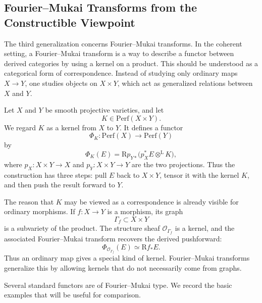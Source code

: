 \subsection{Fourier--Mukai Transforms from the Constructible Viewpoint}

The third generalization concerns Fourier--Mukai transforms. In the coherent
setting, a Fourier--Mukai transform is a way to describe a functor between
derived categories by using a kernel on a product. This should be understood
as a categorical form of correspondence. Instead of studying only ordinary maps
\(X\to Y\), one studies objects on \(X\times Y\), which act as generalized
relations between \(X\) and \(Y\).

Let \(X\) and \(Y\) be smooth projective varieties, and let
\[
K\in \mathrm{Perf}(X\times Y).
\]
We regard \(K\) as a kernel from \(X\) to \(Y\). It defines a functor
\[
\Phi_K:\mathrm{Perf}(X)\longrightarrow \mathrm{Perf}(Y)
\]
by
\[
\Phi_K(E)
=
\mathrm{R}p_{Y*}\bigl(p_X^*E\otimes^{\mathrm L}K\bigr),
\]
where \(p_X:X\times Y\to X\) and \(p_Y:X\times Y\to Y\) are the two projections.
Thus the construction has three steps: pull \(E\) back to \(X\times Y\), tensor
it with the kernel \(K\), and then push the result forward to \(Y\).

The reason that \(K\) may be viewed as a correspondence is already visible for
ordinary morphisms. If \(f:X\to Y\) is a morphism, its graph
\[
\Gamma_f\subset X\times Y
\]
is a subvariety of the product. The structure sheaf \(\mathcal O_{\Gamma_f}\)
is a kernel, and the associated Fourier--Mukai transform recovers the derived
pushforward:
\[
\Phi_{\mathcal O_{\Gamma_f}}(E)
\simeq
\mathrm{R}f_*E.
\]
Thus an ordinary map gives a special kind of kernel. Fourier--Mukai transforms
generalize this by allowing kernels that do not necessarily come from graphs.

Several standard functors are of Fourier--Mukai type. We record the basic
examples that will be useful for comparison.

